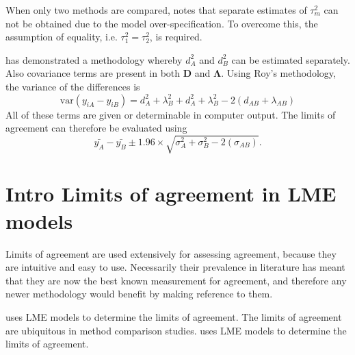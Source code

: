 \documentclass[12pt, a4paper]{report}
\theoremstyle{plain}
\theoremstyle{definition}
\theoremstyle{remark}
\begin{document}
	When only two methods are compared, \citet{BXC2008} notes that separate estimates of $\tau^2_m$ can not be obtained due to the model over-specification. To overcome this, the assumption of equality, i.e. $\tau^2_1 = \tau^2_2$, is required.
	\newpage
	
	\newpage
	
	
	\citet{ARoy2009} has demonstrated a methodology whereby $d^2_{A}$ and $d^2_{B}$ can be estimated separately. Also covariance terms are present in both $\boldsymbol{D}$ and $\boldsymbol{\Lambda}$. Using Roy's methodology, the variance of the differences is
	\begin{equation}
	\mbox{var} (y_{iA}-y_{iB})= d^2_{A} + \lambda^2_{B} + d^2_{A} + \lambda^2_{B} - 2(d_{AB} + \lambda_{AB})
	\end{equation}
	All of these terms are given or determinable in computer output.
	The limits of agreement can therefore be evaluated using
	\begin{equation}
	\bar{y_{A}}-\bar{y_{B}} \pm 1.96 \times \sqrt{ \sigma^2_{A} + \sigma^2_{B}  - 2(\sigma_{AB})}.
	\end{equation}
	\newpage


\section{Intro Limits of agreement in LME models}

Limits of agreement are used extensively for assessing agreement, because they are intuitive and easy to use.
Necessarily their prevalence in literature has meant that they are now the best known measurement for agreement, and therefore any newer methodology would benefit by making reference to them.

\citet{BXC2008} uses LME models to determine the limits of agreement. 
The limits of agreement \citep{BA86} are ubiquitous in method comparison studies. \citet{BXC2008} uses LME models to determine the limits of agreement. 
\end{document}
